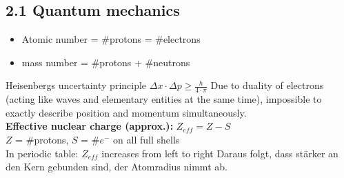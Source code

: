 \begin{multicols*}{4}
\subsection{2.1 Quantum mechanics}{
    \begin{itemize}[noitemsep, leftmargin=*]
        \item Atomic number = \#protons = \#electrons
        \item mass number = \#protons + \#neutrons
    \end{itemize}
    Heisenbergs uncertainty principle $\Delta x \cdot \Delta p \geq \frac{h}{4 \cdot \pi}$ Due to duality of electrons (acting like waves and elementary entities at the same time), impossible to exactly describe position and momentum simultaneously.\\
    \textbf{Effective nuclear charge (approx.):}   $Z_{eff} = Z-S$\\
    $Z$ = \#protons, $S$ = \#$e^-$ on all full shells
    \vspace{1mm}\\
	In periodic table: $Z_{eff}$ increases from left to right
    Daraus folgt, dass   stärker an den Kern gebunden sind, der Atomradius nimmt ab. 
}



\end{multicols*}
